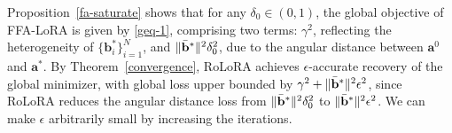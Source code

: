 \documentclass{article}
\theoremstyle{plain}
\theoremstyle{definition}
\theoremstyle{remark}
\begin{document}
Proposition~\ref{fa-saturate} shows that for any $\delta_0 \in (0,1)$, the global objective of FFA-LoRA is given by \eqref{geq-1}, comprising two terms: $\gamma^2$, reflecting the heterogeneity of $\{\mathbf{b}_i^*\}_{i=1}^N$, and $\|\Bar{\mathbf{b}}^* \|^2 \delta_0^2$, due to the angular distance between $\mathbf{a}^0$ and $\mathbf{a}^*$. By Theorem~\ref{convergence}, RoLoRA achieves $\epsilon$-accurate recovery of the global minimizer, with global loss upper bounded by $\gamma^2 + \|\Bar{\mathbf{b}}^* \|^2\epsilon^2$, since RoLoRA reduces the angular distance loss from $\|\Bar{\mathbf{b}}^* \|^2\delta_0^2$ to $\|\Bar{\mathbf{b}}^* \|^2\epsilon^2$. We can make $\epsilon$ arbitrarily small by increasing the iterations.




\newpage



\end{document}

